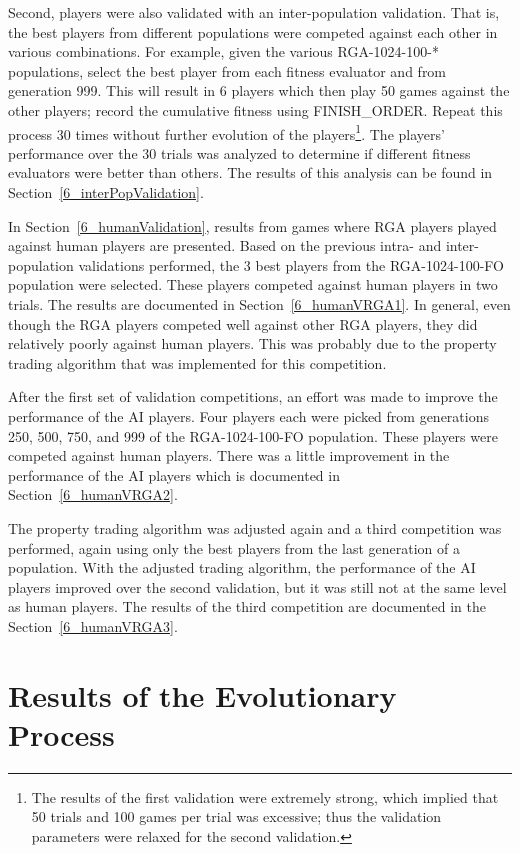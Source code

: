 Second, players were also validated with an inter-population validation. That
is, the best players from different populations were competed against each other
in various combinations. For example, given the various RGA-1024-100-*
populations, select the best player from each fitness evaluator and from
generation 999. This will result in 6 players which then play 50 games against
the other players; record the cumulative fitness using FINISH\_ORDER. Repeat
this process 30 times without further evolution of the players\footnote{The
results of the first validation were extremely strong, which implied that 50
trials and 100 games per trial was excessive; thus the validation parameters
were relaxed for the second validation.}. The players' performance over the 30
trials was analyzed to determine if different fitness evaluators were better
than others. The results of this analysis can be found in
Section~\ref{6_interPopValidation}.

In Section~\ref{6_humanValidation}, results from games where RGA players played
against human players are presented. Based on the previous intra- and
inter-population validations performed, the 3 best players from the
RGA-1024-100-FO population were selected. These players competed against human
players in two trials. The results are documented in Section~\ref{6_humanVRGA1}.
In general, even though the RGA players competed well against other RGA
players, they did relatively poorly against human players. This was probably
due to the property trading algorithm that was implemented for this competition.

After the first set of validation competitions, an effort was made to improve
the performance of the AI players. Four players each were picked from
generations 250, 500, 750, and 999 of the RGA-1024-100-FO population. These
players were competed against human players. There was a little improvement in
the performance of the AI players which is documented in
Section~\ref{6_humanVRGA2}.

The property trading algorithm was adjusted again and a third competition was
performed, again using only the best players from the last generation of a
population. With the adjusted trading algorithm, the performance of the AI
players improved over the second validation, but it was still not at the same
level as human players. The results of the third competition are documented in
the Section~\ref{6_humanVRGA3}.

\section{Results of the Evolutionary Process}\label{6_evoresults}

